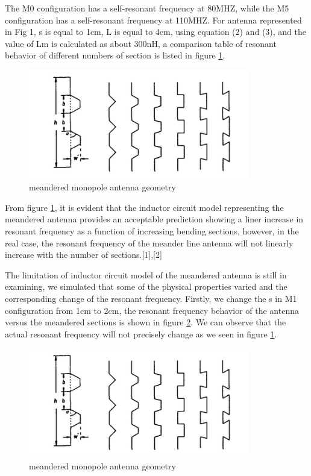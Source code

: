 The M0 configuration has a self-resonant frequency at 80MHZ, while the M5 configuration has a self-resonant frequency at 110MHZ. For antenna represented in Fig 1, s is equal to 1cm, L is equal to 4cm, using equation (2) and (3), and the value of Lm is calculated as about 300nH, a comparison table of resonant behavior of different numbers of section is listed in figure \ref{fig:efield_fig3}.

\begin{figure}[h]
	\begin{center}
		\includegraphics[width=3.8in]{./images/efield_image2.png}
		\caption{meandered monopole antenna geometry}
		\label{fig:efield_fig3}
	\end{center}
\end{figure}

From figure \ref{fig:efield_fig3}, it is evident that the inductor circuit model representing the meandered antenna provides an acceptable prediction showing a liner increase in resonant frequency as a function of increasing bending sections, however, in the real case, the resonant frequency of the meander line antenna will not linearly increase with the number of sections.[1],[2]

The limitation of inductor circuit model of the meandered antenna is still in examining, we simulated that some of the physical properties varied and the corresponding change of the resonant frequency. Firstly, we change the s in M1 configuration from 1cm to 2cm, the resonant frequency behavior of the antenna versus the meandered sections is shown in figure \ref{fig:efield_fig4}. We can observe that the actual resonant frequency will not precisely change as we seen in figure \ref{fig:efield_fig3}. 

\begin{figure}[h]
	\begin{center}
		\includegraphics[width=3.8in]{./images/efield_image2.png}
		\caption{meandered monopole antenna geometry}
		\label{fig:efield_fig4}
	\end{center}
\end{figure}

